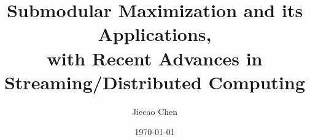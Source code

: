 \documentclass[11pt]{article}
\begin{document}
\title{Submodular Maximization and its Applications, \\ \Large{with Recent Advances in Streaming/Distributed Computing}}
\author{Jiecao Chen}
\date{\today}

\maketitle













%
\end{document}
